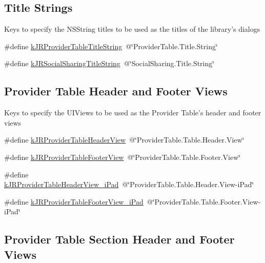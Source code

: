 \subsection*{Title Strings}
\label{_amgrp57383e7526d006c80c9394d9945c0a3b}
 \label{group__custom_interface_titleStrings}
\hypertarget{group__custom_interface_titleStrings}{}


Keys to specify the NSString titles to be used as the titles of the library's dialogs \begin{DoxyCompactItemize}
\item 
\#define \hyperlink{group__custom_interface_gaf728e45125be9ca6fa515a39a77e7ce7}{kJRProviderTableTitleString}~@\char`\"{}ProviderTable.Title.String\char`\"{}
\item 
\#define \hyperlink{group__custom_interface_ga8fb89469dc5225bf0ea4d1faca6aa2ab}{kJRSocialSharingTitleString}~@\char`\"{}SocialSharing.Title.String\char`\"{}
\end{DoxyCompactItemize}
\subsection*{Provider Table Header and Footer Views}
\label{_amgrp7070181e423f8bdc938527d6916a62cf}
 Keys to specify the UIViews to be used as the Provider Table's header and footer views \begin{DoxyCompactItemize}
\item 
\#define \hyperlink{group__custom_interface_ga1a0f39bfdb880fdd0b8b39cbec492b6f}{kJRProviderTableHeaderView}~@\char`\"{}ProviderTable.Table.Header.View\char`\"{}
\item 
\#define \hyperlink{group__custom_interface_ga2b5c9162dd7701a552147ae1607a3b4d}{kJRProviderTableFooterView}~@\char`\"{}ProviderTable.Table.Footer.View\char`\"{}
\item 
\#define \hyperlink{group__custom_interface_gafaf90a1aa537b105ebc2409ceacc652f}{kJRProviderTableHeaderView\_\-iPad}~@\char`\"{}ProviderTable.Table.Header.View-\/iPad\char`\"{}
\item 
\#define \hyperlink{group__custom_interface_gaa23a63165d46433e2ec24ba44ef771da}{kJRProviderTableFooterView\_\-iPad}~@\char`\"{}ProviderTable.Table.Footer.View-\/iPad\char`\"{}
\end{DoxyCompactItemize}
\subsection*{Provider Table Section Header and Footer Views}
\label{_amgrp0087c3b750e6b14cf3b110df546a77d4}
 \label{group__custom_interface_tableSectionViews}
\hypertarget{group__custom_interface_tableSectionViews}{}


